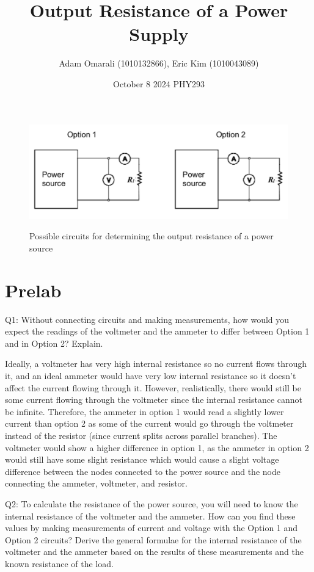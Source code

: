 \documentclass[12pt]{article}
\begin{document}
\title{\bf{Output Resistance of a Power Supply}}
\author{Adam Omarali (1010132866), Eric Kim (1010043089)}
\date{October 8 2024 \linebreak 
PHY293}
\maketitle

\begin{figure}[H]
    \begin{centering}
    \includegraphics[width=0.5 \textwidth]{img/circuits.png}
    \label{fig:Circuits}
    \caption{Possible circuits for determining the output resistance of a power source}
    \end{centering}
\end{figure}

\section{Prelab}
Q1: Without connecting circuits and making measurements, how would you expect the readings of the voltmeter and the ammeter to differ between Option 1 and in Option 2? Explain.

Ideally, a voltmeter has very high internal resistance so no current flows through it, and an ideal ammeter would have very low internal resistance so it doesn't affect the current flowing through it. 
However, realistically, there would still be some current flowing through the voltmeter since the internal resistance cannot be infinite. 
Therefore, the ammeter in option 1 would read a slightly lower current than option 2 as some of the current would go through the voltmeter instead of the resistor (since current splits across parallel branches). 
The voltmeter would show a higher difference in option 1, as the ammeter in option 2 would still have some slight resistance which would cause a slight voltage difference between the nodes connected to the power source and the node connecting the ammeter, voltmeter, and resistor.

Q2: To calculate the resistance of the power source, you will need to know the internal resistance of the voltmeter and the ammeter. How can you find these values by making measurements of current and voltage with the Option 1 and Option 2 circuits? Derive the general formulae for the internal resistance of the voltmeter and the ammeter based on the results of these measurements and the known resistance of the load.
\end{document}
